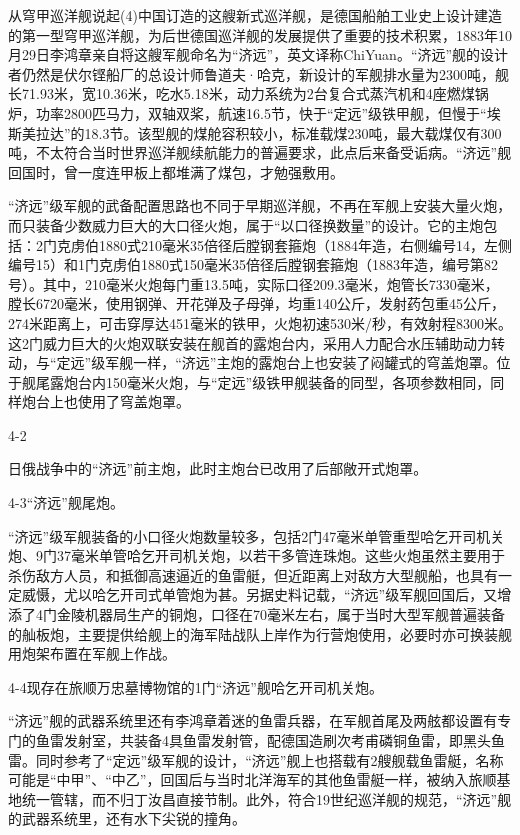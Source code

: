 \documentclass[12pt,UTF8]{ctexbook}
\begin{document}
从穹甲巡洋舰说起(4)中国订造的这艘新式巡洋舰，是德国船舶工业史上设计建造的第一型穹甲巡洋舰，为后世德国巡洋舰的发展提供了重要的技术积累，1883年10月29日李鸿章亲自将这艘军舰命名为“济远”，英文译称ChiYuan。“济远”舰的设计者仍然是伏尔铿船厂的总设计师鲁道夫·哈克，新设计的军舰排水量为2300吨，舰长71.93米，宽10.36米，吃水5.18米，动力系统为2台复合式蒸汽机和4座燃煤锅炉，功率2800匹马力，双轴双桨，航速16.5节，快于“定远”级铁甲舰，但慢于“埃斯美拉达”的18.3节。该型舰的煤舱容积较小，标准载煤230吨，最大载煤仅有300吨，不太符合当时世界巡洋舰续航能力的普遍要求，此点后来备受诟病。“济远”舰回国时，曾一度连甲板上都堆满了煤包，才勉强敷用。

“济远”级军舰的武备配置思路也不同于早期巡洋舰，不再在军舰上安装大量火炮，而只装备少数威力巨大的大口径火炮，属于“以口径换数量”的设计。它的主炮包括：2门克虏伯1880式210毫米35倍径后膛钢套箍炮（1884年造，右侧编号14，左侧编号15）和1门克虏伯1880式150毫米35倍径后膛钢套箍炮（1883年造，编号第82号）。其中，210毫米火炮每门重13.5吨，实际口径209.3毫米，炮管长7330毫米，膛长6720毫米，使用钢弹、开花弹及子母弹，均重140公斤，发射药包重45公斤，274米距离上，可击穿厚达451毫米的铁甲，火炮初速530米/秒，有效射程8300米。这2门威力巨大的火炮双联安装在舰首的露炮台内，采用人力配合水压辅助动力转动，与“定远”级军舰一样，“济远”主炮的露炮台上也安装了闷罐式的穹盖炮罩。位于舰尾露炮台内150毫米火炮，与“定远”级铁甲舰装备的同型，各项参数相同，同样炮台上也使用了穹盖炮罩。

4-2

日俄战争中的“济远”前主炮，此时主炮台已改用了后部敞开式炮罩。

4-3“济远”舰尾炮。

“济远”级军舰装备的小口径火炮数量较多，包括2门47毫米单管重型哈乞开司机关炮、9门37毫米单管哈乞开司机关炮，以若干多管连珠炮。这些火炮虽然主要用于杀伤敌方人员，和抵御高速逼近的鱼雷艇，但近距离上对敌方大型舰船，也具有一定威慑，尤以哈乞开司式单管炮为甚。另据史料记载，“济远”级军舰回国后，又增添了4门金陵机器局生产的铜炮，口径在70毫米左右，属于当时大型军舰普遍装备的舢板炮，主要提供给舰上的海军陆战队上岸作为行营炮使用，必要时亦可换装舰用炮架布置在军舰上作战。

4-4现存在旅顺万忠墓博物馆的1门“济远”舰哈乞开司机关炮。

“济远”舰的武器系统里还有李鸿章着迷的鱼雷兵器，在军舰首尾及两舷都设置有专门的鱼雷发射室，共装备4具鱼雷发射管，配德国造刷次考甫磷铜鱼雷，即黑头鱼雷。同时参考了“定远”级军舰的设计，“济远”舰上也搭载有2艘舰载鱼雷艇，名称可能是“中甲”、“中乙”，回国后与当时北洋海军的其他鱼雷艇一样，被纳入旅顺基地统一管辖，而不归丁汝昌直接节制。此外，符合19世纪巡洋舰的规范，“济远”舰的武器系统里，还有水下尖锐的撞角。
\end{document}

